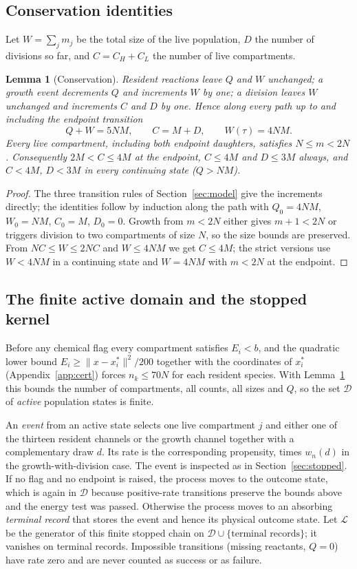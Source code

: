 \documentclass[11pt,a4paper]{article}
\theoremstyle{plain}
\newtheorem{lemma}[theorem]{Lemma}
\theoremstyle{definition}
\theoremstyle{remark}
\newcommand{\cL}{\mathcal L}
\begin{document}
\subsection{Conservation identities}
Let $W=\sum_jm_j$ be the total size of the live population, $D$ the number of divisions so far, and $C=C_H+C_L$ the number of live compartments.

\begin{lemma}[Conservation]\label{lem:conservation}
Resident reactions leave $Q$ and $W$ unchanged; a growth event decrements $Q$ and increments $W$ by one; a division leaves $W$ unchanged and increments $C$ and $D$ by one. Hence along every path up to and including the endpoint transition
\begin{equation}\label{eq:conservation}
Q+W=5NM,\qquad C=M+D,\qquad W(\tau)=4NM.
\end{equation}
Every live compartment, including both endpoint daughters, satisfies $N\leq m<2N$. Consequently $2M<C\leq4M$ at the endpoint, $C\leq4M$ and $D\leq3M$ always, and $C<4M$, $D<3M$ in every continuing state ($Q>NM$).
\end{lemma}
\begin{proof}
The three transition rules of Section~\ref{sec:model} give the increments directly; the identities follow by induction along the path with $Q_0=4NM$, $W_0=NM$, $C_0=M$, $D_0=0$. Growth from $m<2N$ either gives $m+1<2N$ or triggers division to two compartments of size $N$, so the size bounds are preserved. From $NC\leq W\leq2NC$ and $W\leq4NM$ we get $C\leq4M$; the strict versions use $W<4NM$ in a continuing state and $W=4NM$ with $m<2N$ at the endpoint.
\end{proof}

\subsection{The finite active domain and the stopped kernel}
Before any chemical flag every compartment satisfies $E_i<b$, and the quadratic lower bound $E_i\geq\|x-x_i^*\|^2/200$ together with the coordinates of $x_i^*$ (Appendix~\ref{app:cert}) forces $n_k\leq70N$ for each resident species. With Lemma~\ref{lem:conservation} this bounds the number of compartments, all counts, all sizes and $Q$, so the set $\mathcal D$ of \emph{active} population states is finite.

An \emph{event} from an active state selects one live compartment $j$ and either one of the thirteen resident channels or the growth channel together with a complementary draw $d$. Its rate is the corresponding propensity, times $w_n(d)$ in the growth-with-division case. The event is inspected as in Section~\ref{sec:stopped}. If no flag and no endpoint is raised, the process moves to the outcome state, which is again in $\mathcal D$ because positive-rate transitions preserve the bounds above and the energy test was passed. Otherwise the process moves to an absorbing \emph{terminal record} that stores the event and hence its physical outcome state. Let $\cL$ be the generator of this finite stopped chain on $\mathcal D\cup\{\text{terminal records}\}$; it vanishes on terminal records. Impossible transitions (missing reactants, $Q=0$) have rate zero and are never counted as success or as failure.
\end{document}

